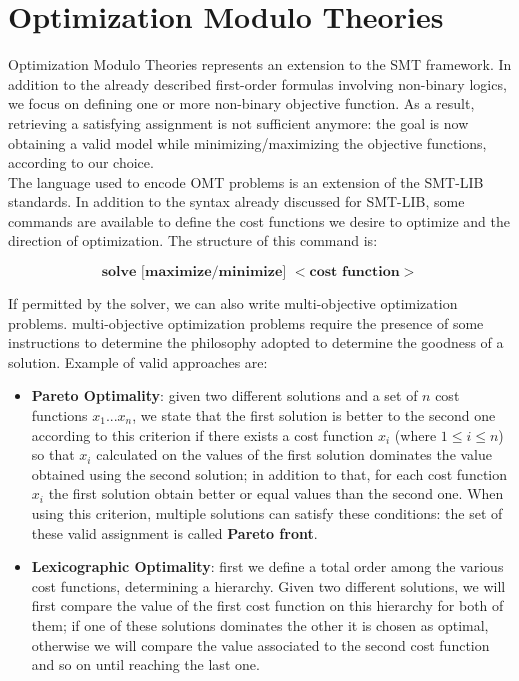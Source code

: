 \section{Optimization Modulo Theories}

Optimization Modulo Theories represents an extension to the SMT framework. In addition to the already described first-order formulas involving non-binary logics, we focus on defining one or more non-binary objective function. As a result, retrieving a satisfying assignment is not sufficient anymore: the goal is now obtaining a valid model while minimizing/maximizing the objective functions, according to our choice.\\
The language used to encode OMT problems is an extension of the SMT-LIB standards. In addition to the syntax already discussed for SMT-LIB, some commands are available to define the cost functions we desire to optimize and the direction of optimization. The structure of this command is:

\begin{equation*}
    \textbf{solve [maximize/minimize] $<$cost function$>$}
\end{equation*}

If permitted by the solver, we can also write multi-objective optimization problems. multi-objective optimization problems  require the presence of some instructions to determine the philosophy adopted to determine the goodness of a solution. Example of valid approaches are:

\begin{itemize}
    \item \textbf{Pareto Optimality}: given two different solutions and a set of $n$ cost functions $x_1...x_n$, we state that the first solution is better to the second one according to this criterion if there exists a cost function $x_i$ (where $1\leq i\leq n$) so that $x_i$ calculated on the values of the first solution dominates the value obtained using the second solution; in addition to that, for each cost function $x_i$ the first solution obtain better or equal values than the second one. When using this criterion, multiple solutions can satisfy these conditions: the set of these valid assignment is called \textbf{Pareto front}.
    \item \textbf{Lexicographic Optimality}: first we define a total order among the various cost functions, determining  a hierarchy. Given two different solutions, we will first compare the value of the first cost function on this hierarchy for both of them; if one of these solutions dominates the other it is chosen as optimal, otherwise we will compare the value associated to the second cost function and so on until reaching the last one.
\end{itemize}

